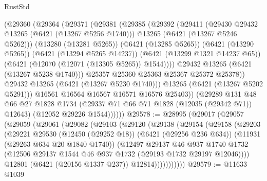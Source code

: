 \begin{lexlean}{RustStd}
\begin{coremodule}
                  (@29360
                    (@29364
                      (@29371
                        (@29381
                          (@29385
                            (@29392
                              (@29411
                                (@29430 @29432 @13265 (@6421 (@13267 @5256 @1740)))
                                @13265
                                (@6421 (@13267 @5246 @5262)))
                              (@13280 (@13281 @5265))
                              (@6421 (@13285 @5265))
                              (@6421 (@13290 @5265))
                              (@6421 (@13294 @5265 @14237))
                              (@6421 (@13299 @1321 @14237 @65))
                              (@6421 (@12070 (@12071 (@13305 @5265)) @1544))))
                          @29432
                          @13265
                          (@6421 (@13267 @5238 @1740)))
                        @25357
                        @25360
                        @25363
                        @25367
                        @25372
                        @25378))
                    @29432
                    @13265
                    (@6421 (@13267 @5230 @1740)))
                  @13265
                  (@6421 (@13267 @5202 @5291)))
                @16561
                @16564
                @16567
                @16571
                @16576
                @25403))
            (@29289
              @131
              @48
              @66
              @27
              @1828
              @1734
              (@29337 @71 @66 @71 @1828 (@12035 (@29342 @71)) @12643)
              (@12052 @29226 @1544))))))
@29578 := @28995
    (@29017
      (@29057
        (@29059
          (@29061
            (@29082
              (@29103
                (@29120
                  (@29138
                    (@29154
                      (@29158
                        (@29203
                          (@29221
                            @29530
                            (@12450 (@29252 @18))
                            (@6421 (@29256 @236 @634))
                            (@11931 (@29263 @634 @20 @1840 @1740))
                            (@12497
                              @29137
                              @46
                              @937
                              @1740
                              @1732
                              (@12506 @29137 @1544 @46 @937 @1732 (@29193 @1732 @29197 @12046))))
                          @12801
                          (@6421 (@20156 @1337 @237))
                          @12814)))))))))))
@29579 := @11633 @1039

\end{coremodule}
\end{lexlean}
